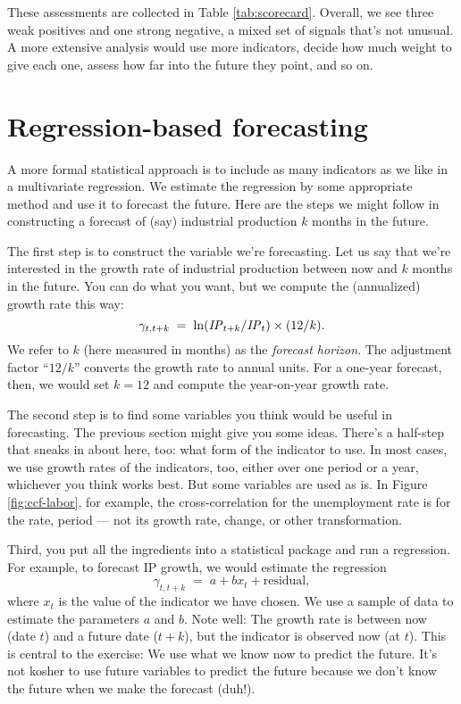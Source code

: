 These assessments are collected in Table \ref{tab:scorecard}.
Overall, we see three weak positives and one strong negative,
a mixed set of signals that's not unusual.
A more extensive analysis would use more indicators,
decide how much weight to give each one,
assess how far into the future they point, and so on.


\section{Regression-based forecasting}

A more formal statistical approach is to include
as many indicators as we like in a multivariate regression.
We estimate the regression by some appropriate method
and use it to forecast the future.
Here are the steps we might follow in constructing a forecast
of (say) industrial production $k$ months in the future.

The first step is to construct the variable we're forecasting.
Let us say that we're interested in the growth rate of industrial
production between now and $k$ months in the future.
You can do what you want, but we compute the (annualized) growth
rate this way:
\[
    \gamma_{t,t+k} \;=\; \ln (\mbox{\em IP\/}_{t+k}/\mbox{\em IP\/}_t) \times (12/k) .
\]
We refer to $k$ (here measured in months) as the {\it forecast
horizon\/}.  The adjustment factor ``$12/k$'' converts the growth
rate to annual units.
For a one-year forecast, then, we would set $k=12$ and compute the
year-on-year growth rate.

The second step is to find some variables you think would be useful
in forecasting.
The previous section might give you some ideas.
There's a half-step that sneaks in about here, too:
what form of the indicator to use.
In most cases, we use growth rates of the indicators, too,
either over one period or a year,
whichever you think works best.
But some variables are used as is.
In Figure \ref{fig:ccf-labor}, for example,
the cross-correlation for the unemployment rate is for the rate, period --- not its growth rate, change, or other transformation.

Third, you put all the ingredients into a statistical package and run a regression.
For example, to forecast IP growth, we would estimate the regression
\[
        \gamma_{t,t+k}  \;=\;  a + b x_t + \mbox{residual},
\]
where $x_t$ is the value of the indicator we have chosen.
We use a sample of data to estimate the parameters $a$ and $b$.
Note well:  The growth rate is between now (date $t$)
and a future date ($t+k$),
but the indicator is observed now (at $t$).
This is central to the exercise:  We use what we know now
to predict the future.
It's not kosher to use future variables to predict the future
because we don't know the future when we make the forecast
(duh!).


